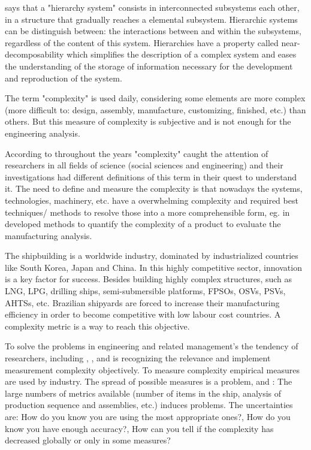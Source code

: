 \cite{Simon62} says that a "hierarchy system" consists in interconnected subsystems each other, in a structure that gradually reaches a elemental subsystem. Hierarchic systems can be distinguish between: the interactions between and within the subsystems, regardless of the content of this system. Hierarchies have a property called near-decomposability which simplifies the description of a complex system and eases the understanding of the storage of information necessary for the development and reproduction of the system.


The term  "complexity" is used daily, considering some elements are more complex (more difficult to: design, assembly, manufacture, customizing, finished, etc.) than others. But this measure of complexity is subjective and is not enough for the engineering analysis.


According to \cite{rodriguez2002} throughout the years "complexity" caught the attention of researchers in all fields of science (social sciences and engineering) and their investigations had different definitions of this term in their quest to understand it. The need to define and measure the complexity is that nowadays the systems, technologies, machinery, etc. have a overwhelming complexity and required best techniques/ methods to resolve those into a more comprehensible form, eg. in \cite{rodriguez2002} developed methods to quantify the complexity of a product to evaluate the manufacturing analysis.


The shipbuilding is a worldwide industry, dominated by industrialized countries like South Korea, Japan and China. In this highly competitive sector, innovation is a key factor for success. Besides building highly complex structures, such as LNG, LPG, drilling ships, semi-submersible platforms, FPSOs, OSVs, PSVs, AHTSs, etc. Brazilian shipyards are forced to increase their manufacturing efficiency in order to become competitive with low labour cost countries. A complexity metric is a way to reach this objective.


To solve the problems in engineering and related management's the tendency of researchers, including \cite{Chryssolouris94}, \cite{Little97}, and \cite{Calinescu00} is recognizing the relevance and implement measurement complexity objectively. To measure complexity empirical measures are used by industry. The spread of possible measures is a problem, \cite{ElMaraghy12} and \cite{Milner13}: The large numbers of metrics available (number of items in the ship, analysis of production sequence and assemblies, etc.) induces problems. The uncertainties are: How do you know you are using the most appropriate ones?, How do you know you have enough accuracy?, How can you tell if the complexity has decreased globally or only in some measures?
